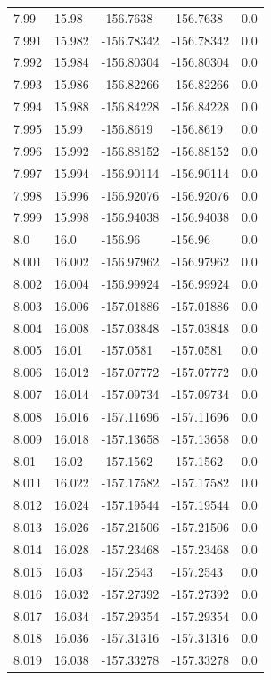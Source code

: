 \begin{tabular}{lllll}
7.99 & 15.98 & -156.7638 & -156.7638 & 0.0 \\
7.991 & 15.982 & -156.78342 & -156.78342 & 0.0 \\
7.992 & 15.984 & -156.80304 & -156.80304 & 0.0 \\
7.993 & 15.986 & -156.82266 & -156.82266 & 0.0 \\
7.994 & 15.988 & -156.84228 & -156.84228 & 0.0 \\
7.995 & 15.99 & -156.8619 & -156.8619 & 0.0 \\
7.996 & 15.992 & -156.88152 & -156.88152 & 0.0 \\
7.997 & 15.994 & -156.90114 & -156.90114 & 0.0 \\
7.998 & 15.996 & -156.92076 & -156.92076 & 0.0 \\
7.999 & 15.998 & -156.94038 & -156.94038 & 0.0 \\
8.0 & 16.0 & -156.96 & -156.96 & 0.0 \\
8.001 & 16.002 & -156.97962 & -156.97962 & 0.0 \\
8.002 & 16.004 & -156.99924 & -156.99924 & 0.0 \\
8.003 & 16.006 & -157.01886 & -157.01886 & 0.0 \\
8.004 & 16.008 & -157.03848 & -157.03848 & 0.0 \\
8.005 & 16.01 & -157.0581 & -157.0581 & 0.0 \\
8.006 & 16.012 & -157.07772 & -157.07772 & 0.0 \\
8.007 & 16.014 & -157.09734 & -157.09734 & 0.0 \\
8.008 & 16.016 & -157.11696 & -157.11696 & 0.0 \\
8.009 & 16.018 & -157.13658 & -157.13658 & 0.0 \\
8.01 & 16.02 & -157.1562 & -157.1562 & 0.0 \\
8.011 & 16.022 & -157.17582 & -157.17582 & 0.0 \\
8.012 & 16.024 & -157.19544 & -157.19544 & 0.0 \\
8.013 & 16.026 & -157.21506 & -157.21506 & 0.0 \\
8.014 & 16.028 & -157.23468 & -157.23468 & 0.0 \\
8.015 & 16.03 & -157.2543 & -157.2543 & 0.0 \\
8.016 & 16.032 & -157.27392 & -157.27392 & 0.0 \\
8.017 & 16.034 & -157.29354 & -157.29354 & 0.0 \\
8.018 & 16.036 & -157.31316 & -157.31316 & 0.0 \\
8.019 & 16.038 & -157.33278 & -157.33278 & 0.0 \\

\end{tabular}
